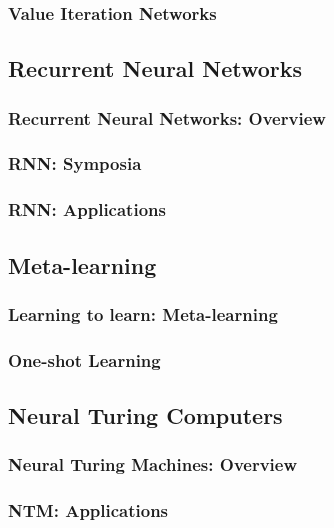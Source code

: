 \documentclass[11pt,
               hyperref={colorlinks,citecolor=pink,linkcolor=red,urlcolor=blue}
               ]{beamer}
\begin{document}
  \begin{frame}
    \frametitle{Value Iteration Networks}

  \end{frame}

  \subsection{Recurrent Neural Networks}

  \begin{frame}
    \frametitle{Recurrent Neural Networks: Overview}

  \end{frame}

  \begin{frame}
    \frametitle{RNN: Symposia}

  \end{frame}

  \begin{frame}
    \frametitle{RNN: Applications}

  \end{frame}

  \subsection{Meta-learning}

  \begin{frame}
    \frametitle{Learning to learn: Meta-learning}

  \end{frame}

  \begin{frame}
    \frametitle{One-shot Learning}

  \end{frame}

  \subsection{Neural Turing Computers}

  \begin{frame}
    \frametitle{Neural Turing Machines: Overview}

  \end{frame}

  \begin{frame}
    \frametitle{NTM: Applications}

  \end{frame}
\end{document}

